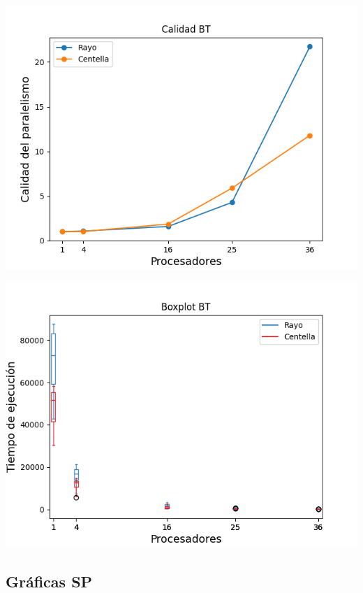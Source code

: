 \begin{center}
 \centering
 \begin{minipage}[b]{.49\textwidth}
  \includegraphics[width=1\linewidth]{plots/calidad-bt.png}
 \end{minipage}
 \begin{minipage}[b]{.49\textwidth}
  \includegraphics[width=1\linewidth]{plots/boxplot-bt.png}
  \label{bt:tiempo}
 \end{minipage}
\end{center}

\newpage

\subsection{Gráficas SP}

